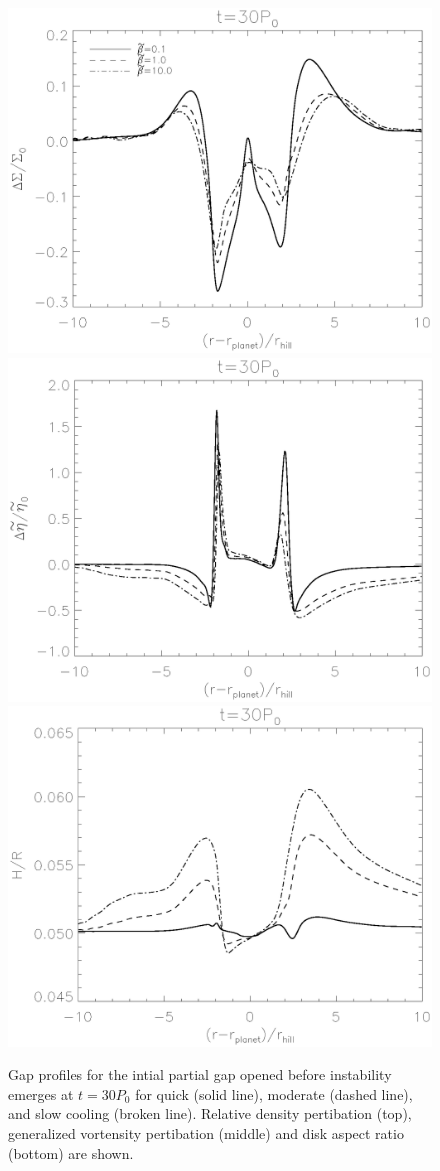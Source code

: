\begin{figure}
  \includegraphics[width=.4\textwidth,clip=true,trim=0.5cm
    2cm 0cm 0cm]{figures/compare_sigma}
  \includegraphics[width=.4\textwidth,clip=true,trim=0.5cm
    2cm 0cm 1cm]{figures/compare_gvortensity}
\includegraphics[width=.4\textwidth,clip=true,trim=0.5cm
    0.5cm 0cm 1cm]{figures/compare_aspectratio}
  \caption{Gap profiles for the intial partial gap opened before instability emerges at $t=30P_0$ for quick (solid line), moderate (dashed line), and slow cooling (broken line). Relative density pertibation (top), generalized vortensity pertibation (middle) and disk aspect ratio (bottom) are shown. \label{intial1D}}
\end{figure}



